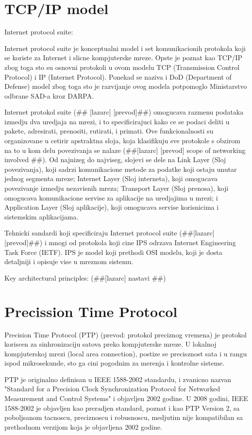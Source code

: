 \documentclass[a4paper,12pt, master]{etf}
\begin{document}
	\section{TCP/IP model}
	Internet protocol suite:

	Internet protocol suite je konceptualni model i set komunikacionih protokola koji se koriste za
	Internet i slicne kompjuterske mreze. Opste je poznat kao TCP/IP zbog toga sto su osnovni
	protokoli u ovom modelu TCP (Transmission Control Protocol) i IP (Internet Protocol). Ponekad
	se naziva i DoD (Department of Defense) model zbog toga sto je razvijanje ovog modela
	potpomoglo Ministarstvo odbrane SAD-a kroz DARPA.

	Internet protokol suite (\#\# [lazarc] [prevod]\#\#) omogucava razmenu podataka izmedju dva
	uredjaja na mrezi, i to specificirajuci kako ce se podaci deliti u pakete, adresirati,
	prenositi, rutirati, i primati. Ove funkcionalnosti su organizovane u cetirir apstraktna sloja,
	koja klasifikuju sve protokole s obzirom na to u kom delu povezivanja se nalaze (\#\#[lazarc]
	[prevod] scope of networking involved \#\#). Od najnizeg do najviseg, slojevi se dele na Link
	Layer (Sloj povezivanja), koji sadrzi komunikacione metode za podatke koji ostaju unutar jednog
	segmenta mreze; Internet Layer (Sloj interneta), koji omogucava povezivanje izmedju nezavisnih
	mreza; Transport Layer (Sloj prenosa), koji omogucava komunikacione servise za aplikacije na
	uredjajima u mrezi; i Application Layer (Sloj aplikacije), koji omogucava servise korisnicima i
	sistemskim aplikacijama.

	Tehnicki sandardi koji specificiraju Internet protocol suite (\#\#[lazarc] [prevod]\#\#) i mnogi od
	protokola koji cine IPS odrzava Internet Engineering Task Force (IETF). IPS je model koji
	prethodi OSI modelu, koji je dosta detaljniji i opisuje vise u mreznom sistemu.

	Key architectural principles:
	(\#\#[lazarc] nastavi \#\#)

	\section{Precission Time Protocol}
	Precision Time Protocol (PTP) (prevod: protokol preciznog vremena) je protokol
	koriscen za sinhronizaciju satova preko kompjuterske mreze. U lokalnoj
	kompjuterskoj mrezi (local area connection), postize se precisznost sata i u rangu
	ispod mikrosekunde, sto ga cini pogodnim za merenja i kontrolne sisteme.

	PTP je originalno definisan u IEEE 1588-2002 standardu, i zvanicno nazvan
	"Standard for a Precision Clock Synchronization Protocol for Networked Measurement
	and Control Systems" i objavljen 2002 godine. U 2008 godini, IEEE 1588-2002 je
	objavljen kao preradjen standard, poznat i kao PTP Version 2, sa poboljsanom tacnoscu,
	preciznoscu i robusnoscu, medjutim nije kompatibilan sa prethodnom verzijom koja je objavljena
	2002 godine.
\end{document}
